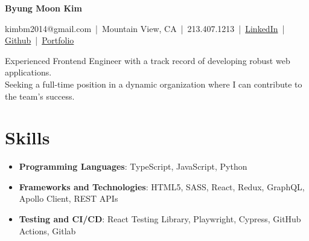 \documentclass[a4paper,10pt]{article}
\begin{document}
\pagestyle{empty}

\begin{center}
    {\LARGE \textbf{Byung Moon Kim}}
\end{center}
\noindent \begin{center}
    kimbm2014@gmail.com \,|\, Mountain View, CA \,|\, 213.407.1213 \,|\, \href{https://www.linkedin.com/in/ray-kim0727}{LinkedIn} \,|\, \href{https://github.com/moonnada}{Github} \,|\, \href{https://raykim0727.vercel.app/}{Portfolio}
\end{center}

\vspace{1.5mm}

\begin{center}
    Experienced Frontend Engineer with a track record of developing robust web applications.\\
    Seeking a full-time position in a dynamic organization where I can contribute to the team’s success.
\end{center}

\vspace{1.5mm}

\section*{Skills}\vspace{0.5mm}
\begin{itemize}
    \item \textbf{Programming Languages}: TypeScript, JavaScript, Python\vspace{0.5ex}
    \item \textbf{Frameworks and Technologies}: HTML5, SASS, React, Redux, GraphQL, Apollo Client, REST APIs\vspace{0.5ex}
    \item \textbf{Testing and CI/CD}: React Testing Library, Playwright, Cypress, GitHub Actions, Gitlab\vspace{0.5ex}
    
\end{itemize}

\vspace{3mm}
\end{document}
